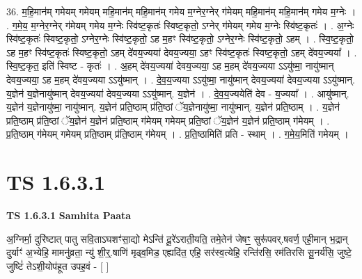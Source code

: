 \documentclass[17pt]{extarticle}
\begin{document}
36. म॒हि॒मान॑म् गमेयम् गमेयम् महि॒मान॑म् महि॒मान॑म् गमेय म॒ग्नेर॒ग्नेर् ग॑मेयम् महि॒मान॑म् महि॒मान॑म् गमेय म॒ग्नेः । . ग॒मे॒य॒ म॒ग्नेर॒ग्नेर् ग॑मेयम् गमेय म॒ग्नेः स्वि॑ष्ट॒कृतः॑ स्विष्ट॒कृतो॒ ऽग्नेर् ग॑मेयम् गमेय म॒ग्नेः स्वि॑ष्ट॒कृतः॑ । . अ॒ग्नेः स्वि॑ष्ट॒कृतः॑ स्विष्ट॒कृतो॒ ऽग्नेर॒ग्नेः स्वि॑ष्ट॒कृतो॒ ऽह म॒हꣳ स्वि॑ष्ट॒कृतो॒ ऽग्नेर॒ग्नेः स्वि॑ष्ट॒कृतो॒ ऽहम् । . स्वि॒ष्ट॒कृतो॒ ऽह म॒हꣳ स्वि॑ष्ट॒कृतः॑ स्विष्ट॒कृतो॒ ऽहम् दे॑वय॒ज्यया॑ देवय॒ज्यया॒ ऽहꣳ स्वि॑ष्ट॒कृतः॑ स्विष्ट॒कृतो॒ ऽहम् दे॑वय॒ज्यया᳚ । . स्वि॒ष्ट॒कृत॒ इति॑ स्विष्ट - कृतः॑ । . अ॒हम् दे॑वय॒ज्यया॑ देवय॒ज्यया॒ ऽह म॒हम् दे॑वय॒ज्यया ऽऽयु॑ष्मा॒ नायु॑ष्मान् देवय॒ज्यया॒ ऽह म॒हम् दे॑वय॒ज्यया ऽऽयु॑ष्मान् । . दे॒व॒य॒ज्यया ऽऽयु॑ष्मा॒ नायु॑ष्मान् देवय॒ज्यया॑ देवय॒ज्यया ऽऽयु॑ष्मान्. य॒ज्ञेन॑ य॒ज्ञेनायु॑ष्मान् देवय॒ज्यया॑ देवय॒ज्यया ऽऽयु॑ष्मान्. य॒ज्ञेन॑ । . दे॒व॒य॒ज्ययेति॑ देव - य॒ज्यया᳚ । . आयु॑ष्मान्. य॒ज्ञेन॑ य॒ज्ञेनायु॑ष्मा॒ नायु॑ष्मान्. य॒ज्ञेन॑ प्रति॒ष्ठाम् प्र॑ति॒ष्ठां ॅय॒ज्ञेनायु॑ष्मा॒ नायु॑ष्मान्. य॒ज्ञेन॑ प्रति॒ष्ठाम् । . य॒ज्ञेन॑ प्रति॒ष्ठाम् प्र॑ति॒ष्ठां ॅय॒ज्ञेन॑ य॒ज्ञेन॑ प्रति॒ष्ठाम् ग॑मेयम् गमेयम् प्रति॒ष्ठां ॅय॒ज्ञेन॑ य॒ज्ञेन॑ प्रति॒ष्ठाम् ग॑मेयम् । . प्र॒ति॒ष्ठाम् ग॑मेयम् गमेयम् प्रति॒ष्ठाम् प्र॑ति॒ष्ठाम् ग॑मेयम् । . प्र॒ति॒ष्ठामिति॑ प्रति - स्थाम् । . ग॒मे॒य॒मिति॑ गमेयम् । \newline
\pagebreak
{}
\section*{ TS 1.6.3.1 }

\textbf{TS 1.6.3.1 } \newline
\textbf{Samhita Paata} \newline

अ॒ग्निर्मा॒ दुरि॑ष्टात् पातु सवि॒ताऽघशꣳ॑सा॒द्यो मेऽन्ति॑ दू॒रे॑ऽराती॒यति॒ तमे॒तेन॑ जेषꣳ॒॒ सुरू॑पवर्.षवर्ण॒ एही॒मान् भ॒द्रान् दुर्याꣳ॑ अ॒भ्येहि॒ मामनु॑व्रता॒ न्यु॑ शी॒र्॒.षाणि॑ मृढ्व॒मिड॒ एह्यदि॑त॒ एहि॒ सर॑स्व॒त्येहि॒ रन्ति॑रसि॒ रम॑तिरसि सू॒नर्य॑सि॒ जुष्टे॒ जुष्टिं॑ तेऽशी॒योप॑हूत उपह॒वं - [ ] \newline
\end{document}
